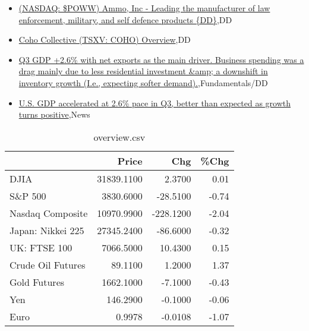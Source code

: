 \documentclass{article}%
\begin{document}
%
\begin{itemize}%
\item%
\href{https://reddit.com/r/Baystreetbets/comments/ye9d69/nasdaq\_poww\_ammo\_inc\_leading\_the\_manufacturer\_of/}{(NASDAQ: \$POWW) Ammo, Inc - Leading the manufacturer of law enforcement, military, and self defence products \{DD\}},DD%
\item%
\href{https://reddit.com/r/Baystreetbets/comments/ye57a7/coho\_collective\_tsxv\_coho\_overview/}{Coho Collective (TSXV: COHO) Overview},DD%
\item%
\href{https://reddit.com/r/StockMarket/comments/yerkb8/q3\_gdp\_26\_with\_net\_exports\_as\_the\_main\_driver/}{Q3 GDP +2.6\% with net exports as the main driver. Business spending was a drag mainly due to less residential investment \&amp; a downshift in inventory growth (I.e., expecting softer demand).},Fundamentals/DD%
\item%
\href{https://reddit.com/r/Economics/comments/yeqs7m/us\_gdp\_accelerated\_at\_26\_pace\_in\_q3\_better\_than/}{U.S. GDP accelerated at 2.6\% pace in Q3, better than expected as growth turns positive},News%
\end{itemize}%


\begin{table}[htbp]%
\caption{overview.csv}%
\centering%
\begin{adjustbox}{width=1\textwidth}%
\begin{tabular}{lrrr}
\toprule
                  &      Price &       Chg &  \%Chg \\
\midrule
             DJIA & 31839.1100 &    2.3700 &  0.01 \\
          S\&P 500 &  3830.6000 &  -28.5100 & -0.74 \\
 Nasdaq Composite & 10970.9900 & -228.1200 & -2.04 \\
Japan: Nikkei 225 & 27345.2400 &  -86.6000 & -0.32 \\
     UK: FTSE 100 &  7066.5000 &   10.4300 &  0.15 \\
Crude Oil Futures &    89.1100 &    1.2000 &  1.37 \\
     Gold Futures &  1662.1000 &   -7.1000 & -0.43 \\
              Yen &   146.2900 &   -0.1000 & -0.06 \\
             Euro &     0.9978 &   -0.0108 & -1.07 \\
\bottomrule
\end{tabular}
%
\end{adjustbox}%
\end{table}
\end{document}
